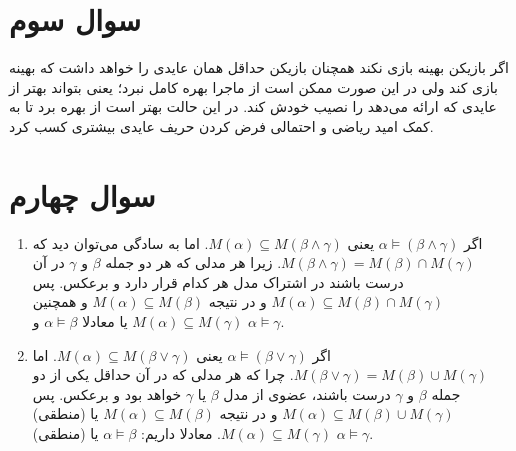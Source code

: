 \documentclass{article}
\begin{document}
	\section*{
		سوال سوم
	}
	اگر بازیکن 
	بهینه بازی نکند همچنان بازیکن
	حداقل همان عایدی را خواهد داشت که  بهینه بازی کند ولی در این صورت ممکن است از ماجرا بهره کامل نبرد؛ یعنی بتواند بهتر از عایدی که
	ارائه می‌دهد را نصیب خودش کند. در این حالت بهتر است از 
	بهره برد تا به کمک امید ریاضی و احتمالی فرض کردن حریف عایدی بیشتری کسب کرد.
	
	\section*{سوال چهارم}
	\begin{enumerate}
		\item 
		اگر
		$\alpha \models (\beta \wedge \gamma)$
		یعنی
		$M(\alpha) \subseteq M(\beta \wedge \gamma)$. 
		اما به سادگی می‌توان دید که 
		$M(\beta \wedge \gamma) = M(\beta) \cap M(\gamma)$. 
		زیرا هر مدلی که هر دو جمله
		$\beta$
		و
		$\gamma$
		در آن درست باشند در اشتراک مدل هر کدام قرار دارد و برعکس. پس
		$M(\alpha) \subseteq M(\beta) \cap M(\gamma)$
		و در نتیجه
		$M(\alpha) \subseteq M(\beta)$
		و همچنین
		$M(\alpha) \subseteq M(\gamma)$
		یا معادلا
		$\alpha \models \beta$
		و
		$\alpha \models \gamma$.
		\item
		اگر 
		$\alpha \models (\beta \vee \gamma)$
		یعنی 
		$M(\alpha) \subseteq M(\beta \vee \gamma) $.
		اما
		$M(\beta \vee \gamma) = M(\beta) \cup M(\gamma)$. 
		چرا که هر مدلی که در آن حداقل یکی از دو جمله $\beta$ و $\gamma$ درست باشند، عضوی از مدل $\beta$ یا $\gamma$  خواهد بود و برعکس. پس 
		$M(\alpha) \subseteq M(\beta) \cup M(\gamma)$
		و در نتیجه
		$M(\alpha) \subseteq M(\beta)$
		یا (منطقی)
		$M(\alpha) \subseteq M(\gamma)$.
		معادلا داریم:
		$\alpha \models \beta$
		یا (منطقی)
		$\alpha \models \gamma$.
		
	\end{enumerate}
\end{document}
